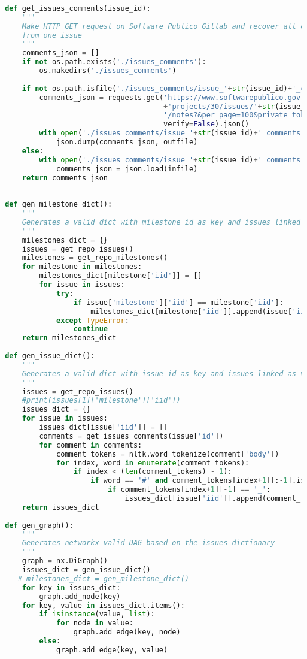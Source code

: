\begin{apendicesenv}
\begin{lstlisting}[language=Python, caption=Algoritmo para mineração e análise das \textit{issues} do SPB]
 
 def get_issues_comments(issue_id):
     """
     Make HTTP GET request on Software Publico Gitlab and recover all commentaries
     from one issue
     """
     comments_json = []
     if not os.path.exists('./issues_comments'):
         os.makedirs('./issues_comments')
 
     if not os.path.isfile('./issues_comments/issue_'+str(issue_id)+'_comments.json'):
         comments_json = requests.get('https://www.softwarepublico.gov.br/gitlab/api/v3/'
                                      +'projects/30/issues/'+str(issue_id)+
                                      '/notes?&per_page=100&private_token=pUvEiwMsSgJ2JU7DGiaf',
                                      verify=False).json()
         with open('./issues_comments/issue_'+str(issue_id)+'_comments.json', 'w') as outfile:
             json.dump(comments_json, outfile)
     else:
         with open('./issues_comments/issue_'+str(issue_id)+'_comments.json', 'r') as infile:
             comments_json = json.load(infile)
     return comments_json
 
 
 def gen_milestone_dict():
     """
     Generates a valid dict with milestone id as key and issues linked as value
     """
     milestones_dict = {}
     issues = get_repo_issues()
     milestones = get_repo_milestones()
     for milestone in milestones:
         milestones_dict[milestone['iid']] = []
         for issue in issues:
             try:
                 if issue['milestone']['iid'] == milestone['iid']:
                     milestones_dict[milestone['iid']].append(issue['iid'])
             except TypeError:
                 continue
     return milestones_dict
 
 def gen_issue_dict():
     """
     Generates a valid dict with issue id as key and issues linked as value
     """
     issues = get_repo_issues()
     #print(issues[1]['milestone']['iid'])
     issues_dict = {}
     for issue in issues:
         issues_dict[issue['iid']] = []
         comments = get_issues_comments(issue['id'])
         for comment in comments:
             comment_tokens = nltk.word_tokenize(comment['body'])
             for index, word in enumerate(comment_tokens):
                 if index < (len(comment_tokens) - 1):
                     if word == '#' and comment_tokens[index+1][:-1].isdigit():
                         if comment_tokens[index+1][-1] == '_':
                             issues_dict[issue['iid']].append(comment_tokens[index+1][:-1])
     return issues_dict
 
 def gen_graph():
     """
     Generates networkx valid DAG based on the issues dictionary
     """
     graph = nx.DiGraph()
     issues_dict = gen_issue_dict()
    # milestones_dict = gen_milestone_dict()
     for key in issues_dict:
         graph.add_node(key)
     for key, value in issues_dict.items():
         if isinstance(value, list):
             for node in value:
                 graph.add_edge(key, node)
         else:
             graph.add_edge(key, value)
 

\end{lstlisting}
\end{apendicesenv}
